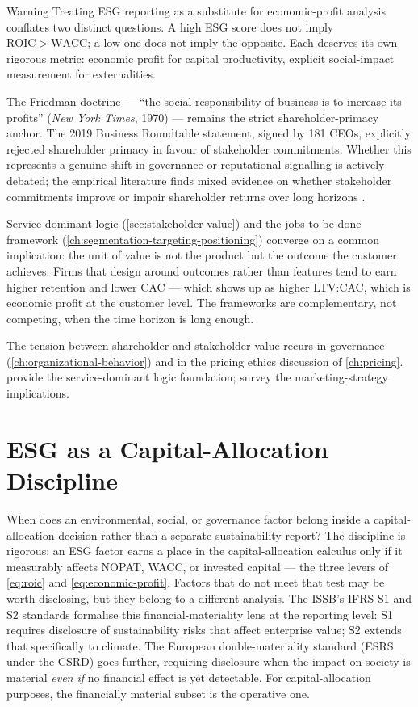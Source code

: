 \begin{admonition}{Warning}
Treating ESG reporting as a substitute for economic-profit analysis conflates two distinct
questions. A high ESG score does not imply \(\mathrm{ROIC}>\mathrm{WACC}\); a low one does not
imply the opposite. Each deserves its own rigorous metric: economic profit for capital
productivity, explicit social-impact measurement for externalities.
\end{admonition}

The Friedman doctrine --- ``the social responsibility of business is to increase its profits''
(\emph{New York Times}, 1970) --- remains the strict shareholder-primacy anchor. The 2019
Business Roundtable statement, signed by 181 CEOs, explicitly rejected shareholder primacy in
favour of stakeholder commitments. Whether this represents a genuine shift in governance or
reputational signalling is actively debated; the empirical literature finds mixed evidence on
whether stakeholder commitments improve or impair shareholder returns over long horizons
\parencite{kotler2021}.

Service-dominant logic (\cref{sec:stakeholder-value}) and the jobs-to-be-done framework
(\cref{ch:segmentation-targeting-positioning}) converge on a common implication: the unit of
value is not the product but the outcome the customer achieves. Firms that design around outcomes
rather than features tend to earn higher retention and lower CAC --- which shows up as higher
LTV:CAC, which is economic profit at the customer level. The frameworks are complementary, not
competing, when the time horizon is long enough.

The tension between shareholder and stakeholder value recurs in governance (\cref{ch:organizational-behavior})
and in the pricing ethics discussion of \cref{ch:pricing}. \textcite{vargo2004service} provide the
service-dominant logic foundation; \textcite{kotler2021} survey the marketing-strategy implications.

\section{ESG as a Capital-Allocation Discipline}\label{sec:esg-capital}

When does an environmental, social, or governance factor belong inside a capital-allocation
decision rather than a separate sustainability report? The discipline is rigorous: an ESG factor
earns a place in the capital-allocation calculus only if it measurably affects NOPAT, WACC, or
invested capital --- the three levers of \cref{eq:roic} and \cref{eq:economic-profit}. Factors
that do not meet that test may be worth disclosing, but they belong to a different analysis.
The ISSB's IFRS S1 and S2 standards formalise this financial-materiality lens at the reporting
level: S1 requires disclosure of sustainability risks that affect enterprise value; S2 extends
that specifically to climate. The European double-materiality standard (ESRS under the CSRD)
goes further, requiring disclosure when the impact on society is material \emph{even if} no
financial effect is yet detectable. For capital-allocation purposes, the financially material
subset is the operative one.

